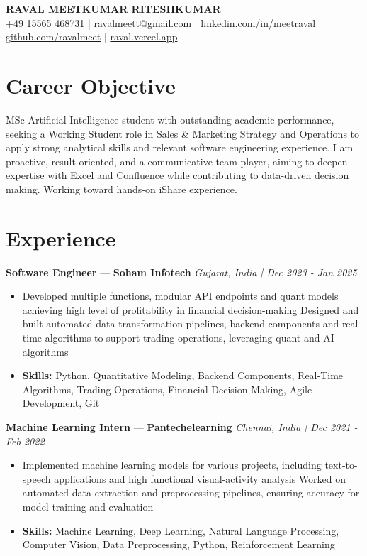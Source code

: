\documentclass[a4paper,10pt]{article}
\begin{document}
\begin{center}
  {\Large\bfseries RAVAL MEETKUMAR RITESHKUMAR}\\[2pt]
  {\small +49 15565 468731 \;|\; \href{mailto:ravalmeett@gmail.com}{ravalmeett@gmail.com} \;|\; \href{https://www.linkedin.com/in/meetraval/}{linkedin.com/in/meetraval} \;|\; \href{https://github.com/ravalmeet}{github.com/ravalmeet} \;|\; \href{https://raval.vercel.app/}{raval.vercel.app}}
\end{center}
\vspace{-3pt}

\section*{Career Objective}
MSc Artificial Intelligence student with outstanding academic performance, seeking a Working Student role in Sales \& Marketing Strategy and Operations to apply strong analytical skills and relevant software engineering experience. I am proactive, result-oriented, and a communicative team player, aiming to deepen expertise with Excel and Confluence while contributing to data-driven decision making. Working toward hands-on iShare experience.\par

\section*{Experience}
\textbf{Software Engineer} — \textbf{Soham Infotech} \hfill \textit{Gujarat, India \;|\; Dec 2023 - Jan 2025}\par
\vspace{1pt}
\begin{itemize}
  \item Developed multiple functions, modular API endpoints and quant models achieving high level of profitability in financial decision-making Designed and built automated data transformation pipelines, backend components and real-time algorithms to support trading operations, leveraging quant and AI algorithms
  \item \textbf{Skills:} Python, Quantitative Modeling, Backend Components, Real-Time Algorithms, Trading Operations, Financial Decision-Making, Agile Development, Git
\end{itemize}
\vspace{3pt}
\textbf{Machine Learning Intern} — \textbf{Pantechelearning} \hfill \textit{Chennai, India \;|\; Dec 2021 - Feb 2022}\par
\vspace{1pt}
\begin{itemize}
  \item Implemented machine learning models for various projects, including text-to-speech applications and high functional visual-activity analysis Worked on automated data extraction and preprocessing pipelines, ensuring accuracy for model training and evaluation
  \item \textbf{Skills:} Machine Learning, Deep Learning, Natural Language Processing, Computer Vision, Data Preprocessing, Python, Reinforcement Learning
\end{itemize}
\end{document}
